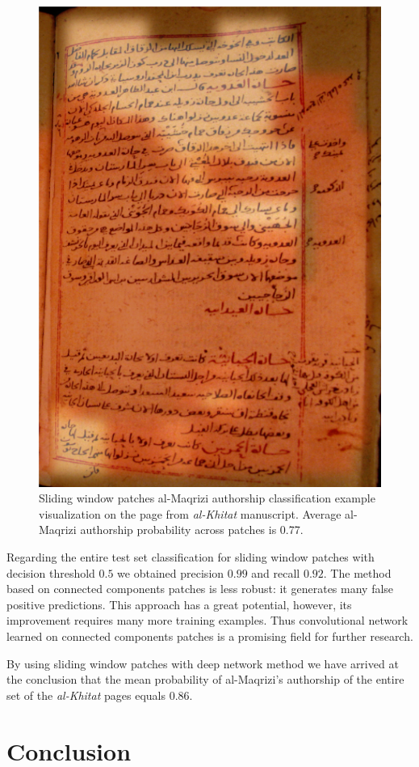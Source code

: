 \documentclass[conference,a4paper,twocolumn]{IEEEtran}
\begin{document}
\begin{figure}[!b]
	\centering
  \includegraphics[width=0.49\linewidth]{figures/hitat_15_fixed.png}
   \caption{Sliding window patches al-Maqrizi authorship classification example visualization on the page from {\it al-Khitat} manuscript. Average al-Maqrizi authorship probability across patches is 0.77.}
	\label{fig:al_maqrizi_classification_example_test_hitat}
\end{figure}

Regarding the entire test set classification for sliding window patches with decision threshold $0.5$ we obtained precision $0.99$ and recall $0.92$. The method based on connected components patches is less robust: it generates many false positive predictions. This approach has a great potential, however, its improvement requires many more training examples. Thus convolutional network learned on connected components patches is a promising field for further research.

By using sliding window patches with deep network method we have arrived at the conclusion that the mean probability of al-Maqrizi's authorship  of the entire set of the {\it al-Khitat} pages equals $0.86$.    

\section{Conclusion}
\end{document}
